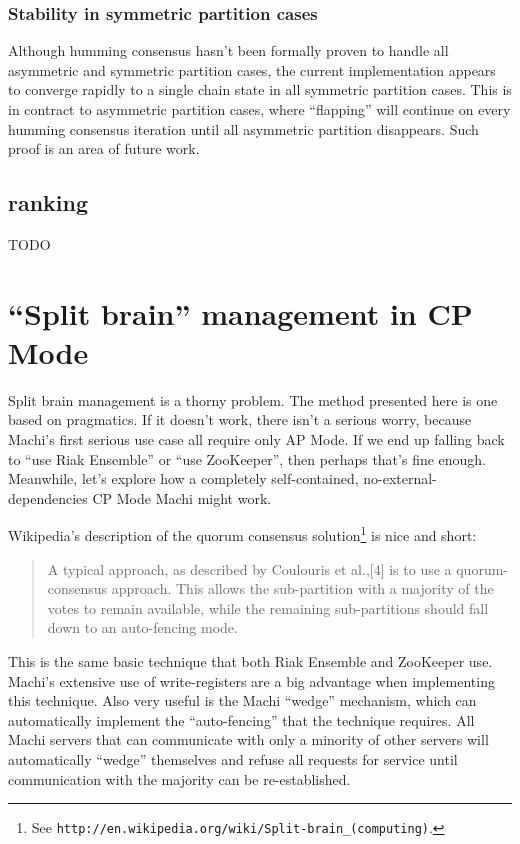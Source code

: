 \documentclass[preprint,10pt]{sigplanconf}
\begin{document}
\subsubsection{Stability in symmetric partition cases}

Although humming consensus hasn't been formally proven to handle all
asymmetric and symmetric partition cases, the current implementation
appears to converge rapidly to a single chain state in all symmetric
partition cases.  This is in contract to asymmetric partition cases,
where ``flapping'' will continue on every humming consensus iteration
until all asymmetric partition disappears.  Such proof is an area of
future work.

\subsection{ranking}
\label{sub:projection-ranking}

TODO

\section{``Split brain'' management in CP Mode}
\label{sec:split-brain-management}

Split brain management is a thorny problem.  The method presented here
is one based on pragmatics.  If it doesn't work, there isn't a serious
worry, because Machi's first serious use case all require only AP Mode.
If we end up falling back to ``use Riak Ensemble'' or ``use ZooKeeper'',
then perhaps that's
fine enough.  Meanwhile, let's explore how a
completely self-contained, no-external-dependencies
CP Mode Machi might work.

Wikipedia's description of the quorum consensus solution\footnote{See
  {\tt http://en.wikipedia.org/wiki/Split-brain\_(computing)}.} is nice
and short:

\begin{quotation}
A typical approach, as described by Coulouris et al.,[4] is to use a
quorum-consensus approach. This allows the sub-partition with a
majority of the votes to remain available, while the remaining
sub-partitions should fall down to an auto-fencing mode.
\end{quotation}

This is the same basic technique that
both Riak Ensemble and ZooKeeper use.  Machi's
extensive use of write-registers are a big advantage when implementing
this technique.  Also very useful is the Machi ``wedge'' mechanism,
which can automatically implement the ``auto-fencing'' that the
technique requires.  All Machi servers that can communicate with only
a minority of other servers will automatically ``wedge'' themselves
and refuse all requests for service until communication with the
majority can be re-established.
\end{document}
